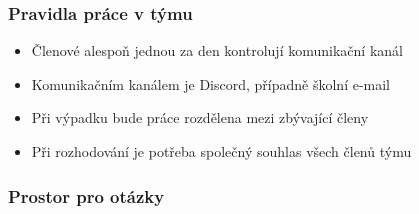 \documentclass{beamer}
\begin{document}
	\begin{frame}
		\frametitle{Pravidla práce v týmu}
		\begin{itemize}
			\item Členové alespoň jednou za den kontrolují komunikační kanál
			\item Komunikačním kanálem je Discord, případně školní e-mail
			\item Při výpadku bude práce rozdělena mezi zbývající členy
			\item Při rozhodování je potřeba společný souhlas všech členů týmu
		\end{itemize}
	\end{frame}				
			
	\begin{frame}
		\frametitle{Prostor pro otázky}
	\end{frame}
\end{document}
